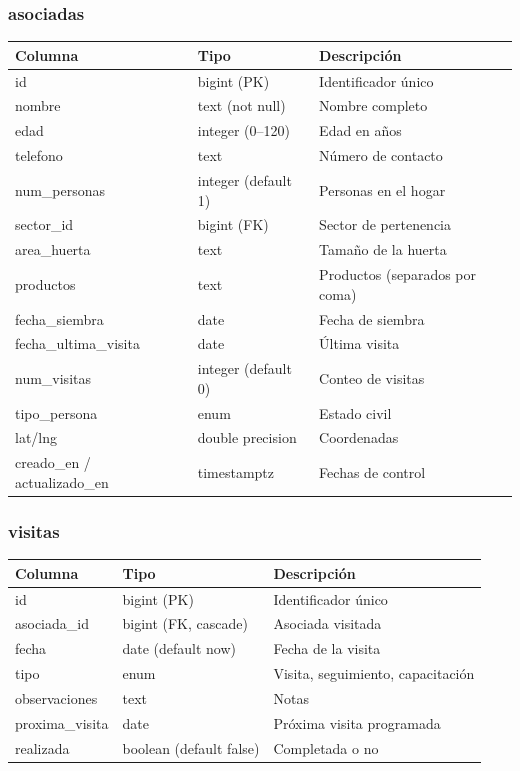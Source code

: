 \documentclass[12pt]{article}
\begin{document}
\subsubsection{asociadas}
\begin{tabular}{lll}
  \toprule
  \textbf{Columna} & \textbf{Tipo} & \textbf{Descripci\'on} \\
  \midrule
  id & bigint (PK) & Identificador \'unico \\
  nombre & text (not null) & Nombre completo \\
  edad & integer (0--120) & Edad en a\~nos \\
  telefono & text & N\'umero de contacto \\
  num\_personas & integer (default 1) & Personas en el hogar \\
  sector\_id & bigint (FK) & Sector de pertenencia \\
  area\_huerta & text & Tama\~no de la huerta \\
  productos & text & Productos (separados por coma) \\
  fecha\_siembra & date & Fecha de siembra \\
  fecha\_ultima\_visita & date & \'Ultima visita \\
  num\_visitas & integer (default 0) & Conteo de visitas \\
  tipo\_persona & enum & Estado civil \\
  lat/lng & double precision & Coordenadas \\
  creado\_en / actualizado\_en & timestamptz & Fechas de control \\
  \bottomrule
\end{tabular}

\subsubsection{visitas}
\begin{tabular}{lll}
  \toprule
  \textbf{Columna} & \textbf{Tipo} & \textbf{Descripci\'on} \\
  \midrule
  id & bigint (PK) & Identificador \'unico \\
  asociada\_id & bigint (FK, cascade) & Asociada visitada \\
  fecha & date (default now) & Fecha de la visita \\
  tipo & enum & Visita, seguimiento, capacitaci\'on \\
  observaciones & text & Notas \\
  proxima\_visita & date & Pr\'oxima visita programada \\
  realizada & boolean (default false) & Completada o no \\
  \bottomrule
\end{tabular}
\end{document}
